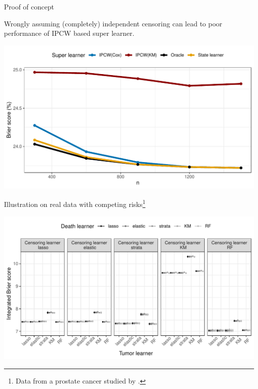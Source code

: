 \documentclass[smaller]{beamer}\usepackage{listings}
\begin{document}
\begin{frame}[label={sec:org243659a}]{Proof of concept}
\small

Wrongly assuming (completely) independent censoring can lead to poor performance
of IPCW based super learner.

\begin{center}
\includegraphics[width=.9\textwidth]{./ipcw-fail.pdf}
\end{center}
\end{frame}

\begin{frame}[label={sec:org70f1b5b}]{Illustration on real data with competing risks\footnote{Data from a prostate cancer studied by \cite{kattan2000pretreatment}.}}
\begin{center}
\includegraphics[width=1\textwidth]{./zelefski-real-data.pdf}
\end{center}
\end{frame}
\end{document}
